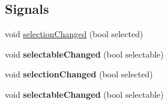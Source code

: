 \subsection*{Signals}
\begin{DoxyCompactItemize}
\item 
void \hyperlink{class_q_c_p_abstract_item_aa5cffb034fc65dbb91c77e02c1c14251}{selection\+Changed} (bool selected)
\item 
void {\bfseries selectable\+Changed} (bool selectable)\hypertarget{class_q_c_p_abstract_item_a5b266c11aac61cb511901f3911dac2a3}{}\label{class_q_c_p_abstract_item_a5b266c11aac61cb511901f3911dac2a3}

\item 
void {\bfseries selection\+Changed} (bool selected)\hypertarget{class_q_c_p_abstract_item_aa5cffb034fc65dbb91c77e02c1c14251}{}\label{class_q_c_p_abstract_item_aa5cffb034fc65dbb91c77e02c1c14251}

\item 
void {\bfseries selectable\+Changed} (bool selectable)\hypertarget{class_q_c_p_abstract_item_a5b266c11aac61cb511901f3911dac2a3}{}\label{class_q_c_p_abstract_item_a5b266c11aac61cb511901f3911dac2a3}

\end{DoxyCompactItemize}
